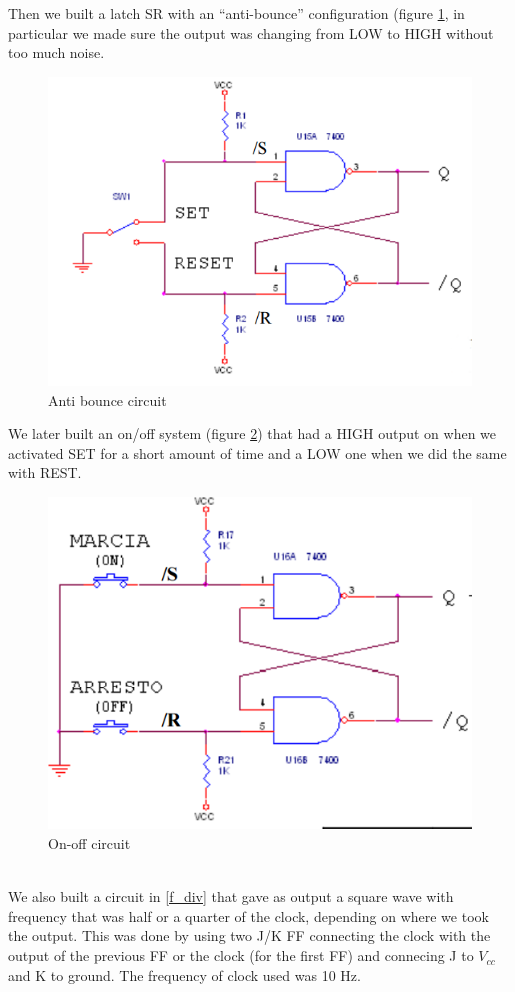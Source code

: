 Then we  built a latch SR with an ``anti-bounce'' configuration (figure \ref{bounce}, in particular we made sure the output was changing from LOW to HIGH without too much noise.
\begin{figure}[H]
\centering
\includegraphics[width=.7\textwidth]{11/bounce.png}
\caption{Anti bounce circuit}\label{bounce}

\end{figure}
We later built an on/off system (figure \ref{ON_OFF}) that had a HIGH output on when we activated SET for a short amount of time and a LOW one when we did the same with REST.
\begin{figure}[H]
\centering
\includegraphics[width=.7\textwidth]{11/ON_OFF.png}
\caption{On-off circuit}\label{ON_OFF}

\end{figure}\\
We also built a circuit in \ref{f_div} that gave as output a square wave with frequency that was half or a quarter of the clock, depending on where we took the output. This was done by using two J/K FF connecting the clock with the output of the previous  FF or the clock (for the first FF) and connecing J to $V_{cc}$ and K to ground. The frequency of clock used was 10 Hz.
